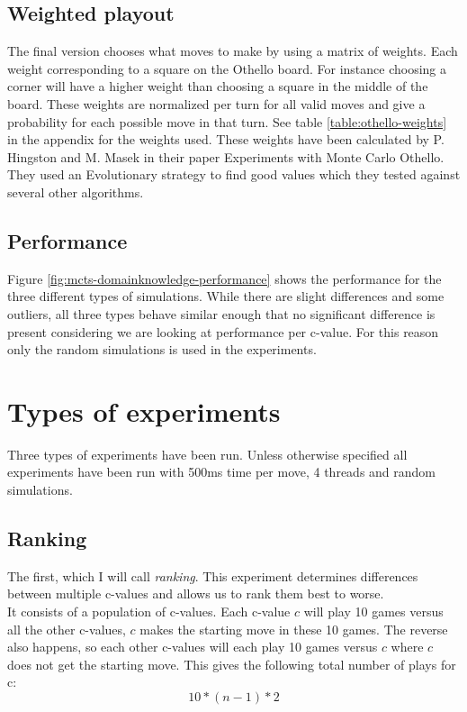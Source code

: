 \documentclass[
11pt, %
english, %
singlespacing, %
headsepline, %
]{MastersDoctoralThesis} %
\begin{document}
\subsection{Weighted playout}
The final version chooses what moves to make by using a matrix of weights. Each weight corresponding to a square on the Othello board. For instance choosing a corner will have a higher weight than choosing a square in the middle of the board. These weights are normalized per turn for all valid moves and give a probability for each possible move in that turn. See table \ref{table:othello-weights} in the appendix for the weights used. These weights have been calculated by P. Hingston and M. Masek in their paper Experiments with Monte Carlo Othello\cite{hingston2007experiments}. They used an Evolutionary strategy to find good values which they tested against several other algorithms.

\subsection{Performance}
Figure \ref{fig:mcts-domainknowledge-performance} shows the performance for the three different types of simulations. While there are slight differences and some outliers, all three types behave similar enough that no significant difference is present considering we are looking at performance per c-value. For this reason only the random simulations is used in the experiments.

\section{Types of experiments}
\label{section:type-experiments}
Three types of experiments have been run. Unless otherwise specified all experiments have been run with 500ms time per move, 4 threads and random simulations.

\subsection{Ranking}
\label{section:ranking}
The first, which I will call \textit{ranking}. This experiment determines differences between multiple c-values and allows us to rank them best to worse.\\

It consists of a population of c-values. Each c-value $c$ will play 10 games versus all the other c-values, $c$ makes the starting move in these 10 games. The reverse also happens, so each other c-values will each play 10 games versus $c$ where $c$ does not get the starting move. This gives the following total number of plays for c:
\[
   10 * (n-1) * 2
\]
\end{document}

